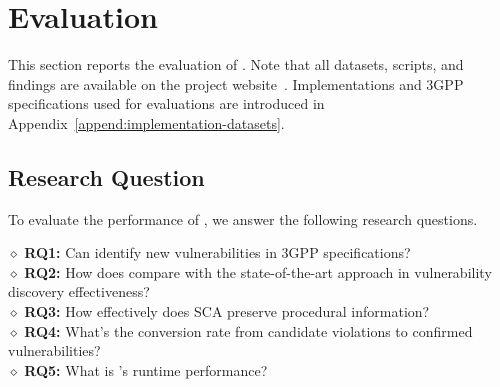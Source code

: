 \section{Evaluation}

\noindent This section reports the evaluation of \lm. Note that all datasets, scripts, and findings are available on the project website~\cite{cellsecinspector2025}. Implementations and 3GPP specifications used for evaluations are introduced in Appendix~\ref{append:implementation-datasets}. 

\subsection{Research Question}
To evaluate the performance of \lm, we answer the following research questions. 

\noindent $\diamond$ \textbf{RQ1:} Can \lm identify new vulnerabilities in 3GPP specifications?  \\
\noindent $\diamond$ \textbf{RQ2:} How does \lm compare with the state-of-the-art approach in vulnerability discovery effectiveness? \\
\noindent $\diamond$ \textbf{RQ3:} How effectively does SCA preserve procedural information? \\
\noindent $\diamond$ \textbf{RQ4:} What's the conversion rate from candidate violations to confirmed vulnerabilities?\\
\noindent $\diamond$ \textbf{RQ5:} What is \lm's runtime performance? 



